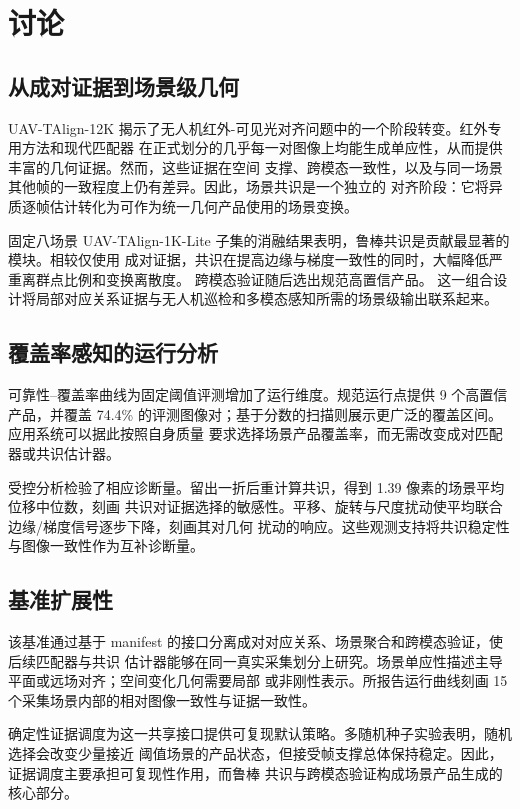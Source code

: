 
\section{讨论}

\subsection{从成对证据到场景级几何}

UAV-TAlign-12K 揭示了无人机红外-可见光对齐问题中的一个阶段转变。红外专用方法和现代匹配器
在正式划分的几乎每一对图像上均能生成单应性，从而提供丰富的几何证据。然而，这些证据在空间
支撑、跨模态一致性，以及与同一场景其他帧的一致程度上仍有差异。因此，场景共识是一个独立的
对齐阶段：它将异质逐帧估计转化为可作为统一几何产品使用的场景变换。

固定八场景 UAV-TAlign-1K-Lite 子集的消融结果表明，鲁棒共识是贡献最显著的模块。相较仅使用
成对证据，共识在提高边缘与梯度一致性的同时，大幅降低严重离群点比例和变换离散度。
跨模态验证随后选出规范高置信产品。
这一组合设计将局部对应关系证据与无人机巡检和多模态感知所需的场景级输出联系起来。

\subsection{覆盖率感知的运行分析}

可靠性--覆盖率曲线为固定阈值评测增加了运行维度。规范运行点提供 9 个高置信产品，并覆盖
74.4\% 的评测图像对；基于分数的扫描则展示更广泛的覆盖区间。应用系统可以据此按照自身质量
要求选择场景产品覆盖率，而无需改变成对匹配器或共识估计器。

受控分析检验了相应诊断量。留出一折后重计算共识，得到 1.39 像素的场景平均位移中位数，刻画
共识对证据选择的敏感性。平移、旋转与尺度扰动使平均联合边缘/梯度信号逐步下降，刻画其对几何
扰动的响应。这些观测支持将共识稳定性与图像一致性作为互补诊断量。

\subsection{基准扩展性}

该基准通过基于 manifest 的接口分离成对对应关系、场景聚合和跨模态验证，使后续匹配器与共识
估计器能够在同一真实采集划分上研究。场景单应性描述主导平面或远场对齐；空间变化几何需要局部
或非刚性表示。所报告运行曲线刻画 15 个采集场景内部的相对图像一致性与证据一致性。

确定性证据调度为这一共享接口提供可复现默认策略。多随机种子实验表明，随机选择会改变少量接近
阈值场景的产品状态，但接受帧支撑总体保持稳定。因此，证据调度主要承担可复现性作用，而鲁棒
共识与跨模态验证构成场景产品生成的核心部分。
